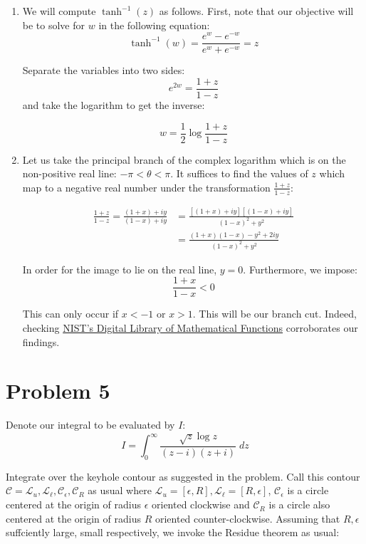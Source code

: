 \documentclass[12pt]{article}%
\newcommand{\C}{\mathcal{C}}
\newcommand{\Lcal}{\mathcal{L}}
\begin{document}
\begin{enumerate}
  \item
  We will compute $\tanh^{-1}(z)$ as follows. First, note that our objective will be to solve for $w$ in the following equation:
  \[ \tanh^{-1}(w) = \frac{e^{w} - e^{-w}}{e^w + e^{-w}} = z\]

  Separate the variables into two sides:
  \[e^{2w} = \frac{1 + z}{1 - z}\]
  and take the logarithm to get the inverse:

  \[w = \frac{1}{2} \log{\frac{1 + z}{1 - z}} \]

  \item
  Let us take the principal branch of the complex logarithm which is on the non-positive real line: $- \pi < \theta < \pi$. It suffices to find the values of $z$ which map to a negative real number under the transformation $\frac{1 + z}{1 -z}$:

  \begin{align*}
    \frac{1 + z}{1 -z} = \frac{(1+x) + iy}{(1-x) + iy} & = \frac{[(1+x) + iy][(1-x) + iy]}{(1-x)^2 + y^2} \\
    & = \frac{(1 + x)(1 - x) - y^2 + 2iy}{(1-x)^2 + y^2}
  \end{align*}

  In order for the image to lie on the real line, $y = 0$. Furthermore, we impose:
  \[ \frac{1+x}{1-x} < 0 \]

  This can only occur if $x < -1$ or $x > 1$. This will be our branch cut. Indeed, checking \href{https://dlmf.nist.gov/4.37#ii}{NIST's Digital Library of Mathematical Functions} corroborates our findings.

\end{enumerate}



\section{Problem 5}

Denote our integral to be evaluated by $I$:
\[I = \int_0^\infty \frac{\sqrt{z}\log{z}}{(z-i)(z+i)} \; dz \]

Integrate over the keyhole contour as suggested in the problem. Call this contour $\C = \Lcal_u, \Lcal_\ell, \C_\epsilon, \C_R$ as usual where $\Lcal_u = [\epsilon, R], \Lcal_\ell = [R,\epsilon]$, $\C_\epsilon$ is a circle centered at the origin of radius $\epsilon$ oriented clockwise and $\C_R$ is a circle also centered at the origin of radius $R$ oriented counter-clockwise. Assuming that $R,\epsilon$ suffciently large, small respectively, we invoke the Residue theorem as usual:
\end{document}
